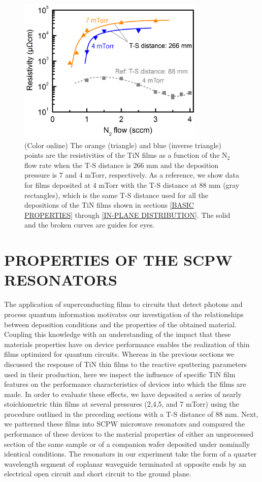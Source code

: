 \begin{figure}
\begin{center}
\includegraphics[width=89mm]{TS-change.jpg}
\end{center}
\caption{(Color online) The orange (triangle) and blue (inverse triangle) points are the resistivities of the TiN films as a function of the N$_{2}$ flow rate when the T-S distance is 266 mm and the deposition pressure is 7 and 4 mTorr, respectively. As a reference, we show data for films deposited at 4 mTorr with the T-S distance at 88 mm (gray rectangles), which is the same T-S distance used for all the depositions of the TiN films shown in sections \ref{BASIC PROPERTIES} through \ref{IN-PLANE DISTRIBUTION}. The solid and the broken curves are guides for eyes.}
\label{TS-change}
\end{figure}
\section{PROPERTIES OF THE SCPW RESONATORS}
The application of superconducting films to circuits that detect photons and process quantum information motivates our investigation of the relationships between deposition conditions and the properties of the obtained material. Coupling this knowledge with an understanding of the impact that these materials properties have on device performance enables the realization of thin films optimized for quantum circuits.  Whereas in the previous sections we discussed the response of TiN thin films to the reactive sputtering parameters used in their production, here we inspect the influence of specific TiN film features on the performance characteristics of devices into which the films are made.  In order to evaluate these effects, we have deposited a series of nearly stoichiometric thin films at several pressures (2,4,5, and 7 mTorr) using the procedure outlined in the preceding sections with a T-S distance of 88 mm.  Next, we patterned these films into SCPW microwave resonators and compared the performance of these devices to the material properties of either an unprocessed section of the same sample or of a companion wafer deposited under nominally identical conditions.  The resonators in our experiment take the form of a quarter wavelength segment of coplanar waveguide terminated at opposite ends by an electrical open circuit and short circuit to the ground plane.

